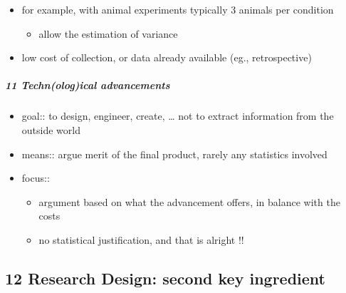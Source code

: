 \documentclass[
]{article}
\providecommand{\tightlist}{%
  \setlength{\itemsep}{0pt}\setlength{\parskip}{0pt}}
\begin{document}
\begin{itemize}
\begin{itemize}
    \begin{itemize}
    \tightlist
    \item
      for example, with animal experiments typically 3 animals per
      condition

      \begin{itemize}
      \tightlist
      \item
        allow the estimation of variance
      \end{itemize}
    \item
      low cost of collection, or data already available (eg.,
      retrospective)
    \end{itemize}
  \end{itemize}
\end{itemize}

\hypertarget{technological-advancements}{%
\subparagraph{11 Techn(olog)ical
advancements}\label{technological-advancements}}

\begin{itemize}
\tightlist
\item
  goal:: to design, engineer, create, \ldots{} not to extract
  information from the outside world
\item
  means:: argue merit of the final product, rarely any statistics
  involved
\item
  focus::

  \begin{itemize}
  \tightlist
  \item
    argument based on what the advancement offers, in balance with the
    costs
  \item
    no statistical justification, and that is alright !!
  \end{itemize}
\end{itemize}

\hypertarget{research-design-second-key-ingredient}{%
\subsection{12 Research Design: second key
ingredient}\label{research-design-second-key-ingredient}}
\end{document}
